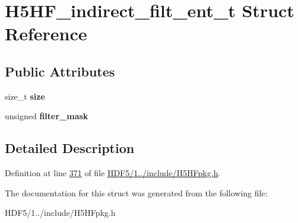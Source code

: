 \hypertarget{struct_h5_h_f__indirect__filt__ent__t}{}\section{H5\+H\+F\+\_\+indirect\+\_\+filt\+\_\+ent\+\_\+t Struct Reference}
\label{struct_h5_h_f__indirect__filt__ent__t}
\subsection*{Public Attributes}
\begin{DoxyCompactItemize}
\item 
\mbox{\label{struct_h5_h_f__indirect__filt__ent__t_a8436ab6e0e220c18802a98a7dddbdc90}} 
size\+\_\+t {\bfseries size}
\item 
\mbox{\label{struct_h5_h_f__indirect__filt__ent__t_a069b37362dfebf21c0cdd0b52b89b632}} 
unsigned {\bfseries filter\+\_\+mask}
\end{DoxyCompactItemize}


\subsection{Detailed Description}


Definition at line \hyperlink{_h_d_f5_21_810_81_2include_2_h5_h_fpkg_8h_source_l00371}{371} of file \hyperlink{_h_d_f5_21_810_81_2include_2_h5_h_fpkg_8h_source}{H\+D\+F5/1../include/\+H5\+H\+Fpkg.\+h}.



The documentation for this struct was generated from the following file\+:\begin{DoxyCompactItemize}
\item 
H\+D\+F5/1../include/\+H5\+H\+Fpkg.\+h\end{DoxyCompactItemize}
